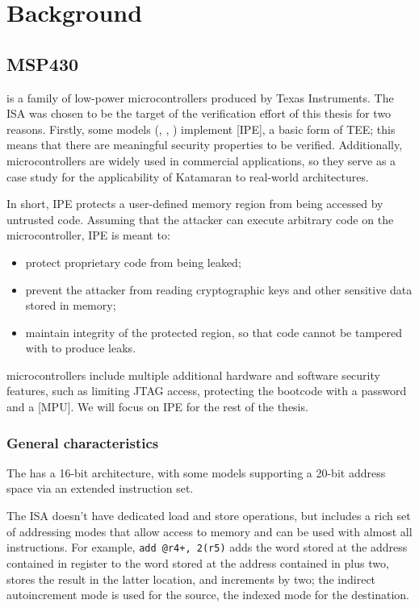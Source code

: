 \chapter{Background}

\section[\texorpdfstring{\msp}{MSP430}]{MSP430}

\msp is a family of low-power microcontrollers produced by Texas Instruments. The \msp ISA was chosen to be the target of the verification effort of this thesis for two reasons. Firstly, some models (\msp[FR58xx], \msp[FR59xx], \msp[FR6xx]) implement [IPE], a basic form of TEE; this means that there are meaningful security properties to be verified. Additionally, \msp microcontrollers are widely used in commercial applications, so they serve as a case study for the applicability of Katamaran to real-world architectures.

In short, IPE protects a user-defined memory region from being accessed by untrusted code. Assuming that the attacker can execute arbitrary code on the microcontroller, IPE is meant to:
\begin{itemize}
\item protect proprietary code from being leaked;
\item prevent the attacker from reading cryptographic keys and other sensitive data stored in memory;
\item maintain integrity of the protected region, so that code cannot be tampered with to produce leaks.
\end{itemize}

\msp microcontrollers include multiple additional hardware and software security features, such as limiting JTAG access, protecting the bootcode with a password \cite{slaa685} and a [MPU]. We will focus on IPE for the rest of the thesis.

\subsection{General characteristics}

The \msp has a 16-bit architecture, with some models supporting a 20-bit address space via an extended instruction set.

The ISA doesn't have dedicated load and store operations, but includes a rich set of addressing modes that allow access to memory and can be used with almost all instructions. For example, \texttt{add @r4+, 2(r5)} adds the word stored at the address contained in register  to the word stored at the address contained in  plus two, stores the result in the latter location, and increments  by two; the indirect autoincrement mode is used for the source, the indexed mode for the destination.

